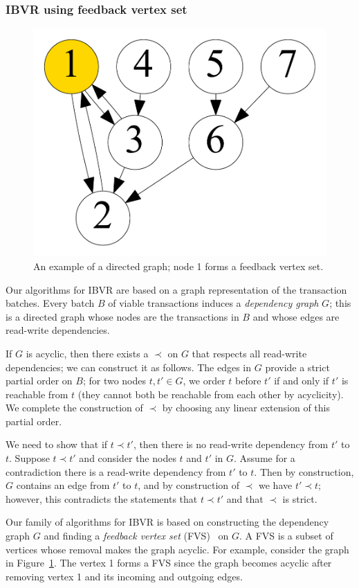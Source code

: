 \subsubsection{IBVR using feedback vertex set}

\begin{figure}[t]
\centering
\includegraphics[width=0.3\columnwidth]{./alg_fig/fvs-eg}
\vspace{-1em}
\caption{An example of a directed graph; node 1 forms a feedback vertex set.}
\label{fig:fvs}
\end{figure}

Our algorithms for IBVR are based on a graph representation of the transaction batches. Every batch $B$ of viable transactions induces a \emph{dependency graph} $G$; this is a directed graph whose nodes are the transactions in $B$ and whose edges are read-write dependencies.

If $G$ is acyclic, then there exists a $\prec$ on $G$ that respects all read-write dependencies; we can construct it as follows. The edges in $G$ provide a strict partial order on $B$; for two nodes $t, t' \in G$, we order $t$ before $t'$ if and only if $t'$ is reachable from $t$ (they cannot both be reachable from each other by acyclicity). We complete the construction of $\prec$  by choosing any linear extension of this partial order.

We need to show that if $t \prec t'$, then there is no read-write dependency from $t'$ to $t$. Suppose $t \prec t'$ and consider the nodes $t$ and $t'$ in $G$. Assume for a contradiction there is a read-write dependency from $t'$ to $t$. Then by construction, $G$ contains an edge from $t'$ to $t$, and by construction of $\prec$ we have $t' \prec t$; however, this contradicts the statements that $t \prec t'$ and that $\prec$ is strict.

Our family of algorithms for IBVR is based on constructing the dependency graph $G$ and finding a \emph{feedback vertex set} (FVS)~\cite{karp1972reducibility} on $G$. A FVS is a subset of vertices whose removal makes the graph acyclic. For example, consider the graph in Figure~\ref{fig:fvs}. The vertex 1 forms a FVS since the graph becomes acyclic after removing vertex 1 and its incoming and outgoing edges.

